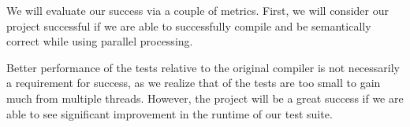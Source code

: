 \documentclass{article}
\begin{document}
\begin{multicols}{2}
We will evaluate our success via a couple of metrics. First, we will consider
our project successful if we are able to successfully compile and be
semantically correct while using parallel processing.

Better performance of the tests relative to the original compiler is not
necessarily a requirement for success, as we realize that of the tests are too
small to gain much from multiple threads. However, the project will be a great
success if we are able to see significant improvement in the runtime of our
test suite.




\vspace{\textheight}
\end{multicols}
\end{document}
